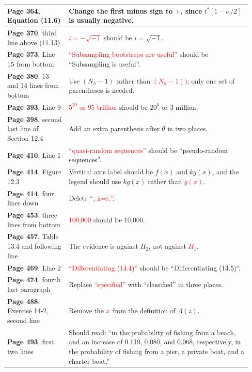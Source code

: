 \documentclass[10pt, a4paper]{article}
\newcommand{\red}[1]{\textcolor{red}{#1}}
\newcommand{\green}[1]{\textcolor{green!50!black}{#1}}
\begin{document}
\begin{longtable}{|R{.41\textwidth}|R{.57\textwidth}|}
	\textbf{Page 364}, Equation (11.6) & Change the first minus sign to \green{$+$}, since \green{$t^*[\!1-\alpha/2]$} is usually negative. \\ \hline
	\textbf{Page 370}, third line above (11.13) & \red{$i=-\sqrt{-1}$} should be \green{$i=\sqrt{-1}$}. \\ \hline
	\textbf{Page 373}, Line 15 from bottom & \red{``Subsampling bootstraps are useful''} should be \green{``Subsampling is useful''}. \\ \hline
	\textbf{Page 380}, 13 and 14 lines from bottom & Use \green{$(N_h-1)$} rather than \red{$(N_h-1))$}; only one set of parentheses is needed. \\ \hline
	\textbf{Page 393}, Line 9 \hfill {} & \red{$5^{20}$ or 95 trillion} should be \green{$20^5$ or 3 million}. \\ \hline
	\textbf{Page 398}, second last line of Section 12.4 & Add an extra parenthesis after $\theta$ in two places. \\ \hline
	\textbf{Page 410}, Line 1 & \red{``quasi-random sequences''} should be \green{``pseudo-random sequences''}. \\ \hline
	\textbf{Page 414}, Figure 12.3 \hfill {} & Vertical axis label should be \green{$f(x)$ and $kg(x)$}, and the legend should use \green{$kg(x)$} rather than \red{$g(x)$}. \\ \hline
	\textbf{Page 414}, four lines down & Delete \red{``, x=r,''}. \\ \hline
	\textbf{Page 453}, three lines from bottom & \red{100,000} should be \green{10,000}. \\ \hline
	\textbf{Page 457}, Table 13.4 and following line & The evidence is against \green{$H_2$}, not against \red{$H_1$}. \\ \hline
	\textbf{Page 469}, Line 2 \hfill {} & \red{``Differentiating (14.4)''} should be \green{``Differentiating (14.5)''}. \\ \hline
	\textbf{Page 474}, fourth last paragraph & Replace \red{``specified''} with \green{``classified''} in three places. \\ \hline
	\textbf{Page 488}, Exercise 14-2, second line & Remove the \red{$x$} from the definition of \green{$\Lambda(z)$}. \\ \hline
	\textbf{Page 493}, first two lines & Should read: \green{``in the probability of fishing from a beach, and an increase of 0.119, 0.080, and 0.068, respectively, in the probability of fishing from a pier, a private boat, and a charter boat.''} \\ \hline

\end{longtable}
\end{document}
